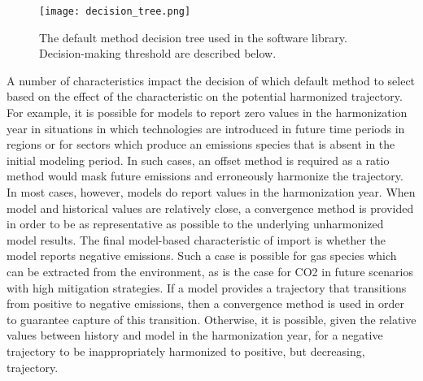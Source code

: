 \begin{figure}
  \begin{center}
    \texttt{[image: decision\_tree.png]}
    \caption[]{
      \label{fig:decision_tree}
      The default method decision tree used in the  software
      library. Decision-making threshold are described below.}
  \end{center}
\end{figure}

A number of characteristics impact the decision of which default method to
select based on the effect of the characteristic on the potential harmonized
trajectory. For example, it is possible for models to report zero values in the
harmonization year in situations in which technologies are introduced in future
time periods in regions or for sectors which produce an emissions species that
is absent in the initial modeling period. In such cases, an offset method is
required as a ratio method would mask future emissions and erroneously harmonize
the trajectory. In most cases, however, models do report values in the
harmonization year. When model and historical values are relatively close, a
convergence method is provided in order to be as representative as possible to
the underlying unharmonized model results. The final model-based characteristic
of import is whether the model reports negative emissions. Such a case is
possible for gas species which can be extracted from the environment, as is the
case for CO2 in future scenarios with high mitigation strategies. If a model
provides a trajectory that transitions from positive to negative emissions, then
a convergence method is used in order to guarantee capture of this
transition. Otherwise, it is possible, given the relative values between history
and model in the harmonization year, for a negative trajectory to be
inappropriately harmonized to positive, but decreasing, trajectory.

